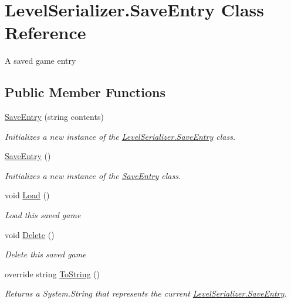 \hypertarget{class_level_serializer_1_1_save_entry}{}\section{Level\+Serializer.\+Save\+Entry Class Reference}
\label{class_level_serializer_1_1_save_entry}


A saved game entry  


\subsection*{Public Member Functions}
\begin{DoxyCompactItemize}
\item 
\hyperlink{class_level_serializer_1_1_save_entry_a60b88cee5e6967c3b5b026ad78b4bc88}{Save\+Entry} (string contents)
\begin{DoxyCompactList}\small\item\em Initializes a new instance of the \hyperlink{class_level_serializer_1_1_save_entry}{Level\+Serializer.\+Save\+Entry} class. \end{DoxyCompactList}\item 
\hyperlink{class_level_serializer_1_1_save_entry_afaecdc1beab475cac800209c45506b4e}{Save\+Entry} ()
\begin{DoxyCompactList}\small\item\em Initializes a new instance of the \hyperlink{class_level_serializer_1_1_save_entry}{Save\+Entry} class. \end{DoxyCompactList}\item 
void \hyperlink{class_level_serializer_1_1_save_entry_aebbbfd37345c0a1b60b9765f483b459a}{Load} ()
\begin{DoxyCompactList}\small\item\em Load this saved game \end{DoxyCompactList}\item 
void \hyperlink{class_level_serializer_1_1_save_entry_a2765a55d5ea9a53a7f2abc9e0d4ea3c9}{Delete} ()
\begin{DoxyCompactList}\small\item\em Delete this saved game \end{DoxyCompactList}\item 
override string \hyperlink{class_level_serializer_1_1_save_entry_a643faa4c478ba8fed108000aa3493157}{To\+String} ()
\begin{DoxyCompactList}\small\item\em Returns a System.\+String that represents the current \hyperlink{class_level_serializer_1_1_save_entry}{Level\+Serializer.\+Save\+Entry}. \end{DoxyCompactList}\end{DoxyCompactItemize}
